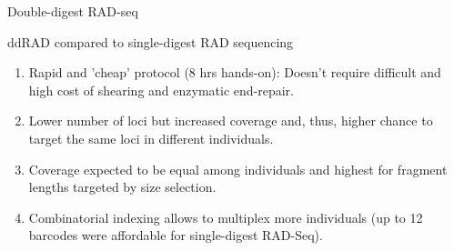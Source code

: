 \documentclass[presentation]{beamer}
\begin{document}
\begin{frame}[label={sec:org8349f7e}]{Double-digest RAD-seq \citep{Peterson2012}}
\begin{latex}
\begin{center}
\begin{figure}[htb]
{
}
\end{figure}
\end{center}
\end{latex}
\end{frame}


\begin{frame}[label={sec:orgeab06f5}]{ddRAD compared to single-digest RAD sequencing}
\begin{enumerate}
\item <1> Rapid and 'cheap' protocol (8 hrs hands-on): Doesn't require
difficult and high cost of shearing and enzymatic end-repair.
\item <2> Lower number of loci but increased coverage and, thus, higher
chance to target the same loci in different individuals.
\item <3> Coverage expected to be equal among individuals and highest for
fragment lengths targeted by size selection.
\item <4> Combinatorial indexing allows to multiplex more individuals (up to
12 barcodes were affordable for single-digest RAD-Seq).
\end{enumerate}
\end{frame}
\end{document}

